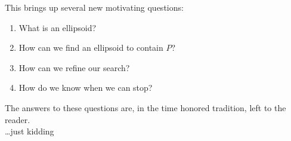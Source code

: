 This brings up several new motivating questions:
\begin{enumerate}
  \item What is an ellipsoid?
    
  \item How can we find an ellipsoid to contain \(P\)?

  \item How can we refine our search?

  \item How do we know when we can stop?
\end{enumerate}

The answers to these questions are, in the time honored tradition, left to the reader.\\



\ldots just kidding
